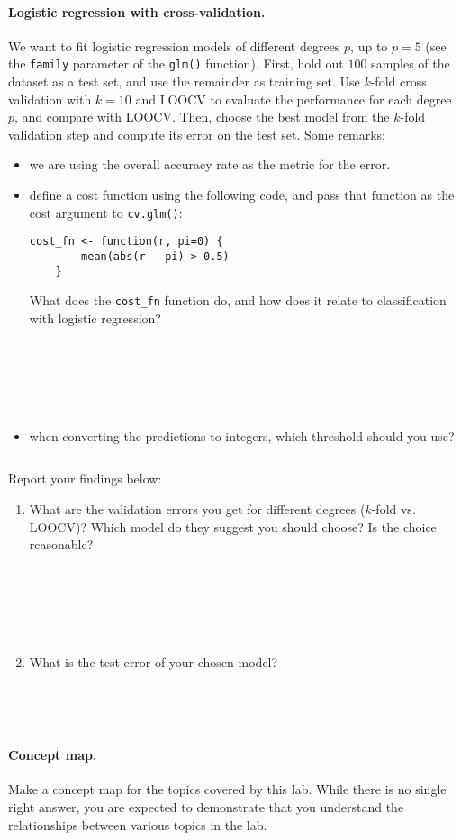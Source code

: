 \documentclass{article}
\begin{document}
\paragraph{Logistic regression with cross-validation.}
We want to fit logistic regression models of different degrees $p$, up to $p =
5$ (see the \texttt{family} parameter of the \texttt{glm()} function).
First, hold out $100$ samples of the dataset as a test set, and use the
remainder as training set. Use $k$-fold cross validation with $k = 10$ and
LOOCV to evaluate the performance for each degree $p$, and compare with LOOCV.
Then, choose the best model from the $k$-fold validation step and compute its
error on the test set. Some remarks:
\begin{itemize}
	\item we are using the overall accuracy rate as the metric for the error.
	\item define a cost function using the following code, and pass that
	function as the cost argument to \texttt{cv.glm()}:
\begin{Verbatim}[frame=single]
	cost_fn <- function(r, pi=0) {
		mean(abs(r - pi) > 0.5)
	}
\end{Verbatim}
	What does the \texttt{cost\_fn} function do, and how does it relate to
	classification with logistic regression?
	\begin{Verbatim}[frame=single]






	\end{Verbatim}

	\item when converting the predictions to integers, which threshold should
	you use?
	\begin{Verbatim}[frame=single]

	\end{Verbatim}
\end{itemize}

Report your findings below:
\begin{enumerate}
	\item What are the validation errors you get for different degrees
	($k$-fold vs. LOOCV)? Which model do they suggest you should choose? Is
	the choice reasonable?
	\begin{Verbatim}[frame=single]






	\end{Verbatim}

	\item What is the test error of your chosen model?
	\begin{Verbatim}[frame=single]




	\end{Verbatim}


\end{enumerate}


\paragraph{Concept map.} Make a concept map for the topics covered by this lab.
While there is no single right answer, you are expected to demonstrate that you
understand the relationships between various topics in the lab.
\end{document}
